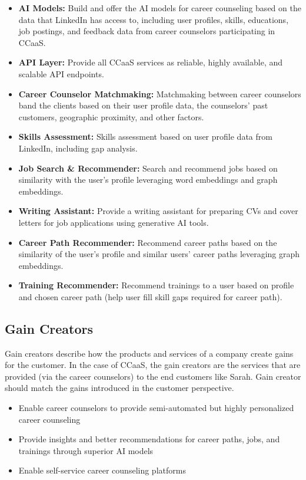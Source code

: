 \begin{itemize}
    \item\textbf{AI Models:}
        Build and offer the AI models for career counseling based on the data that LinkedIn has access to, including
        user profiles, skills, educations, job postings, and feedback data from career counselors participating in CCaaS.
    \item\textbf{API Layer:}
        Provide all CCaaS services as reliable, highly available, and scalable API endpoints.
    \item\textbf{Career Counselor Matchmaking:}
        Matchmaking between career counselors band the clients based on their user profile data, the counselors' past
        customers, geographic proximity, and other factors.
    \item\textbf{Skills Assessment:} 
        Skills assessment based on user profile data from LinkedIn, including gap analysis.
    \item\textbf{Job Search \& Recommender:}
        Search and recommend jobs based on similarity with the user's profile leveraging word embeddings and graph embeddings.
    \item\textbf{Writing Assistant:}
        Provide a writing assistant for preparing CVs and cover letters for job applications using generative AI
        tools.
    \item\textbf{Career Path Recommender:}
        Recommend career paths based on the similarity of the user's profile and  similar users' career paths
        leveraging graph embeddings.
    \item\textbf{Training Recommender:}
        Recommend trainings to a user based on profile and chosen career path (help user fill skill gaps
        required for career path).
\end{itemize}

\subsection{Gain Creators}

Gain creators describe how the products and services of a company create gains for the customer. In the
case of CCaaS, the gain creators are the services that are provided (via the career counselors) to the end
customers like Sarah. Gain creator should match the gains introduced in the customer perspective.

\begin{itemize}
    \item Enable career counselors to provide semi-automated but highly personalized career counseling
    \item Provide insights and better recommendations for career paths, jobs, and trainings through superior AI models
    \item Enable self-service career counseling platforms
\end{itemize}

